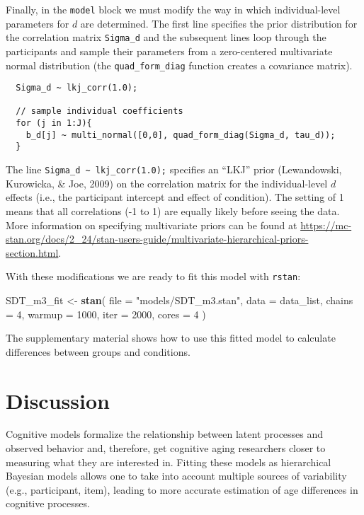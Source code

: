 \documentclass[
  english,
  ,man,floatsintext]{apa6}
\newenvironment{Shaded}{\begin{snugshade}}{\end{snugshade}}
\newcommand{\DataTypeTok}[1]{\textcolor[rgb]{0.13,0.29,0.53}{#1}}
\newcommand{\DecValTok}[1]{\textcolor[rgb]{0.00,0.00,0.81}{#1}}
\newcommand{\KeywordTok}[1]{\textcolor[rgb]{0.13,0.29,0.53}{\textbf{#1}}}
\newcommand{\NormalTok}[1]{#1}
\newcommand{\StringTok}[1]{\textcolor[rgb]{0.31,0.60,0.02}{#1}}
\begin{document}
Finally, in the \texttt{model} block we must modify the way in which individual-level parameters for \(d\) are determined. The first line specifies the prior distribution for the correlation matrix \texttt{Sigma\_d} and the subsequent lines loop through the participants and sample their parameters from a zero-centered multivariate normal distribution (the \texttt{quad\_form\_diag} function creates a covariance matrix).

\begin{verbatim}
  Sigma_d ~ lkj_corr(1.0);

  // sample individual coefficients
  for (j in 1:J){
    b_d[j] ~ multi_normal([0,0], quad_form_diag(Sigma_d, tau_d));
  }
\end{verbatim}

The line \texttt{Sigma\_d\ \textasciitilde{}\ lkj\_corr(1.0);} specifies an \enquote{LKJ} prior (Lewandowski, Kurowicka, \& Joe, 2009) on the correlation matrix for the individual-level \(d\) effects (i.e., the participant intercept and effect of condition). The setting of 1 means that all correlations (-1 to 1) are equally likely before seeing the data. More information on specifying multivariate priors can be found at \url{https://mc-stan.org/docs/2_24/stan-users-guide/multivariate-hierarchical-priors-section.html}.

With these modifications we are ready to fit this model with \texttt{rstan}:

\begin{Shaded}
\begin{Highlighting}[]
\NormalTok{SDT_m3_fit <-}\StringTok{ }\KeywordTok{stan}\NormalTok{(}
  \DataTypeTok{file =} \StringTok{"models/SDT_m3.stan"}\NormalTok{,}
  \DataTypeTok{data =}\NormalTok{ data_list,}
  \DataTypeTok{chains =} \DecValTok{4}\NormalTok{,}
  \DataTypeTok{warmup =} \DecValTok{1000}\NormalTok{,}
  \DataTypeTok{iter =} \DecValTok{2000}\NormalTok{,}
  \DataTypeTok{cores =} \DecValTok{4}
\NormalTok{)}
\end{Highlighting}
\end{Shaded}

The supplementary material shows how to use this fitted model to calculate differences between groups and conditions.

\hypertarget{discussion}{%
\section{Discussion}\label{discussion}}

Cognitive models formalize the relationship between latent processes and observed behavior and, therefore, get cognitive aging researchers closer to measuring what they are interested in. Fitting these models as hierarchical Bayesian models allows one to take into account multiple sources of variability (e.g., participant, item), leading to more accurate estimation of age differences in cognitive processes.
\end{document}
